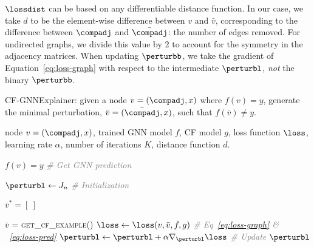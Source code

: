 $\lossdist$ can be based on any differentiable distance function. 
In our case, we take $d$ to be the element-wise difference between $v$ and $\bar{v}$, corresponding to the difference between $\compadj$ and $\bar{\compadj}$: the number of edges removed. 
For undirected graphs, we divide this value by 2 to account for the symmetry in the adjacency matrices. 
When updating $\perturbb$, we take the gradient of Equation~\ref{eq:loss-graph} with respect to the intermediate $\perturbl$, \emph{not} the binary $\perturbb$. 

\pagebreak

\begin{algorithm}[t]
    \caption{CF-GNNExplainer: given a node $v = (\compadj, x)$ where $f(v) = y$, generate the minimal perturbation, $\bar{v} = (\bar{\compadj}, x)$, such that $f(\bar{v}) \neq y$.}
    
    \label{alg:cf-gnnexplainer}

    \begin{algorithmic}
         node $v = (\compadj, x)$, trained GNN model $f$, CF model $g$, loss function $\loss$, learning rate $\alpha$, number of iterations $K$, distance function $d$. 
        
        \STATE
        
        \STATE $f(v) = y$ \qquad \textcolor{gray}{\textit{\# Get GNN prediction} } 
        

        

        \STATE $\perturbl \gets J_n$ \qquad  \textcolor{gray}{\textit{\# Initialization} } 
        
        \STATE $\bar{v}^* = \left[ \:\right]$
        
        \STATE
        
         \label{line:start_loop}
            \STATE $\bar{v}$ = \textsc{get\_cf\_example()}
            \STATE $\loss \gets \loss(v, \bar{v}, f, g)$ \qquad \textcolor{gray}{\textit{\# Eq~\ref{eq:loss-graph} \& ~\ref{eq:loss-pred}} } 
            \STATE $\perturbl \gets \perturbl + \alpha \nabla_{\perturbl} \loss$ \qquad \textcolor{gray}{\textit{\# Update $\perturbl$}} 
        \ENDFOR
        

\end{algorithmic}
\end{algorithm}
